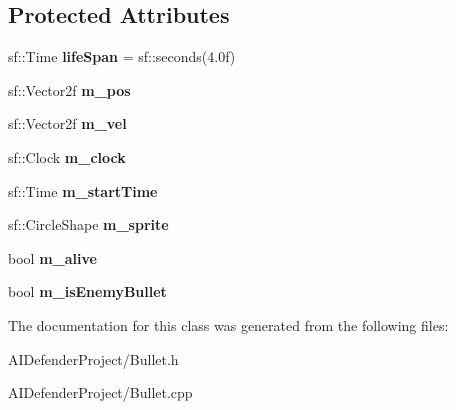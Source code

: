\subsection*{Protected Attributes}
\begin{DoxyCompactItemize}
\item 
\mbox{\label{class_bullet_ab7413a852b4a61d3afa739915f6aabee}} 
sf\+::\+Time {\bfseries life\+Span} = sf\+::seconds(4.\+0f)
\item 
\mbox{\label{class_bullet_ae4fd7b85677ea372cab42e70e41cc912}} 
sf\+::\+Vector2f {\bfseries m\+\_\+pos}
\item 
\mbox{\label{class_bullet_a0fbc2ea9fe4168f68919287ae4243775}} 
sf\+::\+Vector2f {\bfseries m\+\_\+vel}
\item 
\mbox{\label{class_bullet_aea01c8f427c24c577bb2a481c8e42d44}} 
sf\+::\+Clock {\bfseries m\+\_\+clock}
\item 
\mbox{\label{class_bullet_a82d28a9015bb71d7ab456be754388963}} 
sf\+::\+Time {\bfseries m\+\_\+start\+Time}
\item 
\mbox{\label{class_bullet_a7a3ba271067cbba6decf7adfa0583b07}} 
sf\+::\+Circle\+Shape {\bfseries m\+\_\+sprite}
\item 
\mbox{\label{class_bullet_a81722b39f1333ae333103844bb827f5d}} 
bool {\bfseries m\+\_\+alive}
\item 
\mbox{\label{class_bullet_aa831ee51deecd215702614f4232b97e5}} 
bool {\bfseries m\+\_\+is\+Enemy\+Bullet}
\end{DoxyCompactItemize}


The documentation for this class was generated from the following files\+:\begin{DoxyCompactItemize}
\item 
A\+I\+Defender\+Project/Bullet.\+h\item 
A\+I\+Defender\+Project/Bullet.\+cpp\end{DoxyCompactItemize}
